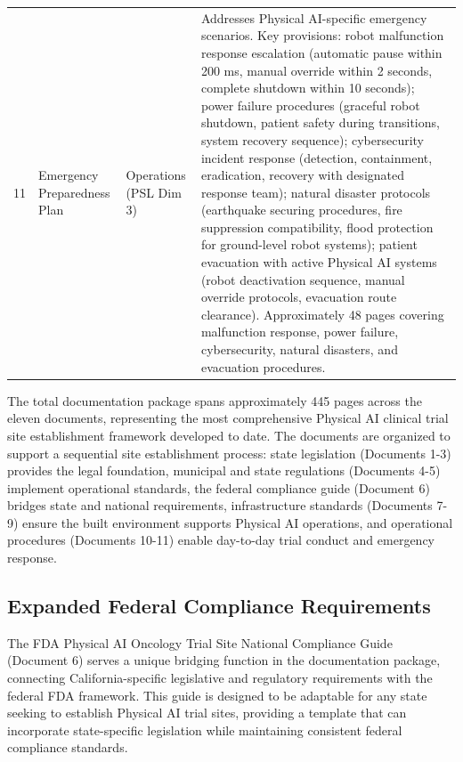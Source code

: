 \begin{longtable}{c l l p{8cm}}
11 & Emergency Preparedness Plan & Operations (PSL Dim 3) & Addresses Physical AI-specific emergency scenarios. Key provisions: robot malfunction response escalation (automatic pause within 200 ms, manual override within 2 seconds, complete shutdown within 10 seconds); power failure procedures (graceful robot shutdown, patient safety during transitions, system recovery sequence); cybersecurity incident response (detection, containment, eradication, recovery with designated response team); natural disaster protocols (earthquake securing procedures, fire suppression compatibility, flood protection for ground-level robot systems); patient evacuation with active Physical AI systems (robot deactivation sequence, manual override protocols, evacuation route clearance). Approximately 48 pages covering malfunction response, power failure, cybersecurity, natural disasters, and evacuation procedures. \\
\end{longtable}

The total documentation package spans approximately 445 pages across the eleven
documents, representing the most comprehensive Physical AI clinical trial site
establishment framework developed to date. The documents are organized to
support a sequential site establishment process: state legislation (Documents
1-3) provides the legal foundation, municipal and state regulations (Documents
4-5) implement operational standards, the federal compliance guide (Document 6)
bridges state and national requirements, infrastructure standards (Documents
7-9) ensure the built environment supports Physical AI operations, and
operational procedures (Documents 10-11) enable day-to-day trial conduct and
emergency response.

\subsection{Expanded Federal Compliance Requirements}
\label{subsec:site-federal-expanded}

The FDA Physical AI Oncology Trial Site National Compliance Guide (Document 6)
serves a unique bridging function in the documentation package, connecting
California-specific legislative and regulatory requirements with the federal
FDA framework. This guide is designed to be adaptable for any state seeking to
establish Physical AI trial sites, providing a template that can incorporate
state-specific legislation while maintaining consistent federal compliance
standards.

